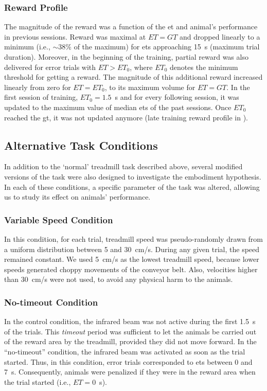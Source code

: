 \subsubsection{Reward Profile} \label{ch:methods:reward}
The magnitude of the reward was a function of the \gls{et} and animal's performance in previous sessions.
Reward was maximal at $ET=GT$ and dropped linearly to a minimum (i.e., $\sim 38\%$ of the maximum) for \glspl{et} approaching 15~s (maximum trial duration).
Moreover, in the beginning of the training, partial reward was also delivered for error trials with $ET>ET_0$, where $ET_0$ denotes the minimum threshold for getting a reward.
The magnitude of this additional reward increased linearly from zero for $ET=ET_0$, to its maximum volume for $ET=GT$.
In the first session of training, $ET_0=1.5$~s and for every following session, it was updated to the maximum value of median \glspl{et} of the past sessions.
Once $ET_0$ reached the \gls{gt}, it was not updated anymore (late training reward profile in ).

\subsection{Alternative Task Conditions}
In addition to the `normal' treadmill task described above, several modified versions of the task were also designed to investigate the embodiment hypothesis.
In each of these conditions, a specific parameter of the task was altered, allowing us to study its effect on animals' performance.

\subsubsection{Variable Speed Condition}
In this condition, for each trial, treadmill speed was pseudo-randomly drawn from a uniform distribution between 5 and 30~cm/s.
During any given trial, the speed remained constant.
We used 5~cm/s as the lowest treadmill speed, because lower speeds generated choppy movements of the conveyor belt.
Also, velocities higher than 30~cm/s were not used, to avoid any physical harm to the animals.

\subsubsection{No-timeout Condition}
In the control condition, the infrared beam was not active during the first 1.5~s of the trials.
This \emph{timeout} period was sufficient to let the animals be carried out of the reward area by the treadmill, provided they did not move forward.
In the ``no-timeout'' condition, the infrared beam was activated as soon as the trial started.
Thus, in this condition, error trials corresponded to \glspl{et} between 0 and 7~s.
Consequently, animals were penalized if they were in the reward area when the trial started (i.e., $ET=0$~s).

